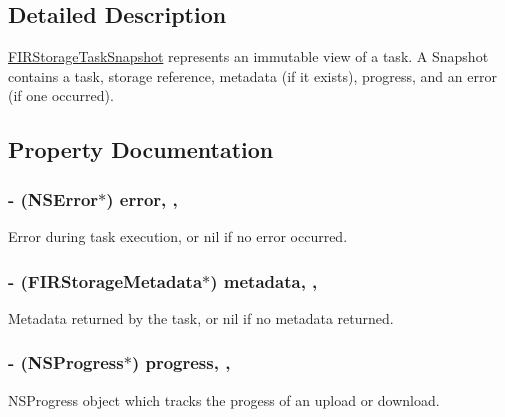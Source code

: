 \subsection{Detailed Description}
\hyperlink{interface_f_i_r_storage_task_snapshot}{F\+I\+R\+Storage\+Task\+Snapshot} represents an immutable view of a task. A Snapshot contains a task, storage reference, metadata (if it exists), progress, and an error (if one occurred). 

\subsection{Property Documentation}
\hypertarget{interface_f_i_r_storage_task_snapshot_a7eb79419e14f2ded56d38ae8713e9299}{}
\subsubsection[{error}]{\setlength{\rightskip}{0pt plus 5cm}-\/ (N\+S\+Error$\ast$) error\hspace{0.3cm}{\ttfamily [read]}, {\ttfamily [nonatomic]}, {\ttfamily [copy]}}\label{interface_f_i_r_storage_task_snapshot_a7eb79419e14f2ded56d38ae8713e9299}
Error during task execution, or nil if no error occurred. \hypertarget{interface_f_i_r_storage_task_snapshot_ae7f7f0af71f1e41b90ddfa95d739ed80}{}
\subsubsection[{metadata}]{\setlength{\rightskip}{0pt plus 5cm}-\/ ({\bf F\+I\+R\+Storage\+Metadata}$\ast$) metadata\hspace{0.3cm}{\ttfamily [read]}, {\ttfamily [nonatomic]}, {\ttfamily [copy]}}\label{interface_f_i_r_storage_task_snapshot_ae7f7f0af71f1e41b90ddfa95d739ed80}
Metadata returned by the task, or nil if no metadata returned. \hypertarget{interface_f_i_r_storage_task_snapshot_a3028516bd16e51c07dbc3c09873b66d5}{}
\subsubsection[{progress}]{\setlength{\rightskip}{0pt plus 5cm}-\/ (N\+S\+Progress$\ast$) progress\hspace{0.3cm}{\ttfamily [read]}, {\ttfamily [nonatomic]}, {\ttfamily [strong]}}\label{interface_f_i_r_storage_task_snapshot_a3028516bd16e51c07dbc3c09873b66d5}
N\+S\+Progress object which tracks the progess of an upload or download. \hypertarget{interface_f_i_r_storage_task_snapshot_a475feffa15b89b28043356a36efeefa6}{}
